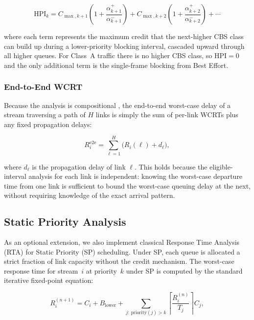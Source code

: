 \documentclass[11pt,a4paper]{article}
\begin{document}
\begin{equation}
\mathrm{HPI}_k =
C_{\max,k+1}\!\left(1+\frac{\alpha_{k+1}^+}{\alpha_{k+1}^-}\right)
+ C_{\max,k+2}\!\left(1+\frac{\alpha_{k+2}^+}{\alpha_{k+2}^-}\right)
+ \cdots
\label{eq:hpi}
\end{equation}

where each term represents the maximum credit that the next-higher CBS class
can build up during a lower-priority blocking interval, cascaded upward
through all higher queues.
For Class~A traffic there is no higher CBS class, so $\mathrm{HPI} = 0$
and the only additional term is the single-frame blocking from Best Effort.

\subsubsection{End-to-End WCRT}

Because the analysis is compositional \cite{CBSnotes}, the end-to-end
worst-case delay of a stream traversing a path of $H$ links is simply the
sum of per-link WCRTs plus any fixed propagation delays:

\begin{equation}
R_i^{\mathrm{e2e}} = \sum_{\ell=1}^{H} \bigl(R_i(\ell) + d_\ell\bigr),
\label{eq:e2e}
\end{equation}

where $d_\ell$ is the propagation delay of link $\ell$.
This holds because the eligible-interval analysis for each link is
independent: knowing the worst-case departure time from one link is
sufficient to bound the worst-case queuing delay at the next, without
requiring knowledge of the exact arrival pattern.

\subsection{Static Priority Analysis}

As an optional extension, we also implement classical Response Time Analysis
(RTA) for Static Priority (SP) scheduling.
Under SP, each queue is allocated a strict fraction of link capacity
without the credit mechanism.
The worst-case response time for stream~$i$ at priority~$k$ under SP is
computed by the standard iterative fixed-point equation:

\begin{equation}
R_i^{(n+1)} = C_i + B_{\mathrm{lower}}
+ \sum_{j:\,\text{priority}(j) > k}
\left\lceil \frac{R_i^{(n)}}{T_j} \right\rceil C_j,
\label{eq:sp_rta}
\end{equation}
\end{document}
